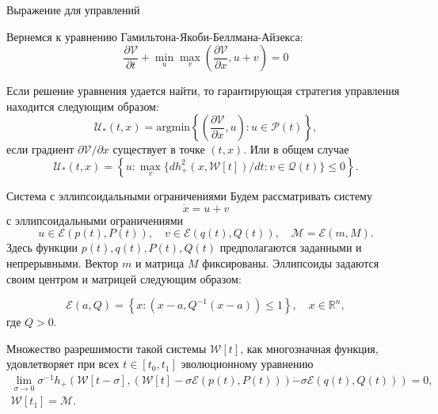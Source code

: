 \documentclass{beamer}
\begin{document}
\begin{frame}{Выражение для управлений}


Вернемся к уравнению Гамильтона-Якоби-Беллмана-Айзекса:
\[
        \frac{\partial \mathcal{V}}{\partial t} + \min_u \max_v \left( \frac{\partial \mathcal{V}}
         {\partial x}, u + v \right) = 0
\]

Если решение уравнения удается найти, то гарантирующая стратегия управления находится следующим образом:
\begin{equation*}
    \mathcal{U}_*(t,x) = \mathrm{argmin} \left\{ \left( \frac{\partial \mathcal{V}}{\partial x},
     u \right) : u \in \mathcal{P}(t) \right\},
\end{equation*}
если градиент \( \partial \mathcal{V} / \partial x \) существует в точке \( (t, x) \). Или в общем случае
\begin{equation*}
    \mathcal{U}_*(t,x) = \left\{ u: \max_v \{ dh_+^2(x, \mathcal{W}[t]) / dt : v \in \mathcal{Q}(t) \} 
     \le 0 \right\}.
\end{equation*}
    
\end{frame}

\begin{frame}{Система с эллипсоидальными ограничениями}
\footnotesize
Будем рассматривать систему
\begin{equation*}
    \dot{x} = u + v
\end{equation*}
с эллипсоидальными ограничениями
\begin{equation*}
    u \in \mathcal{E}(p(t), P(t)), \quad v \in \mathcal{E}(q(t), Q(t)), \quad \mathcal{M} = 
     \mathcal{E}(m, M).
\end{equation*}
Здесь функции \( p(t), q(t), P(t), Q(t) \) предполагаются заданными и непрерывными. Вектор \( m \) и
 матрица \( M \) фиксированы. Эллипсоиды задаются своим центром и матрицей следующим образом:
 
\begin{equation*}
    \mathcal{E}(a, Q) = \left\{ x : (x - a, Q^{-1}(x - a)) \le 1 \right\}, \quad x \in \mathbb{R}^n,
\end{equation*}
где \( Q > 0 \).

Множество разрешимости такой системы \( \mathcal{W}[t] \), как многозначная функция, удовлетворяет при всех \( t \in [t_0, t_1 ]\) эволюционному уравнению
    \begin{gather*}
        \lim_{\sigma \to 0} \sigma^{-1} h_+ \left( \mathcal{W}[t - \sigma], \left( \mathcal{W}[t] - 
         \sigma \mathcal{E}(p(t), P(t)) \right) \dot{-} \sigma \mathcal{E}(q(t), Q(t)) \right) = 0, \\
        \mathcal{W}[t_1] = \mathcal{M}.
    \end{gather*}

\end{frame}
\end{document}
